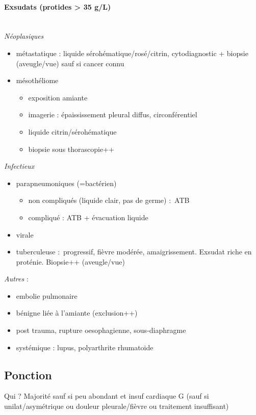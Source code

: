 \paragraph{Exsudats (protides > 35 g/L)}\mbox{}\\
\textit{Néoplasiques} 
\begin{itemize}
\item métastatique : liquide sérohématique/rosé/citrin, cytodiagnostic +
  biopsie (aveugle/vue) sauf si cancer connu
\item mésothéliome 
  \begin{itemize}
  \item exposition amiante
  \item imagerie : épaississement pleural diffus, circonférentiel
  \item liquide citrin/sérohématique
  \item biopsie sous thorascopie++
  \end{itemize}
\end{itemize}

\textit{Infectieux} 
\begin{itemize}
\item parapneumoniques (=bactérien) 
  \begin{itemize}
  \item non compliqués (liquide clair, pas de germe) : ATB
  \item compliqué : ATB + évacuation liquide
  \end{itemize}
\item virale
\item tuberculeuse : progressif, fièvre modérée, amaigrissement. Exsudat riche
  en proténie. Biopsie++ (aveugle/vue)
\end{itemize}

\textit{Autres}  :
\begin{itemize}
\item embolie pulmonaire
\item bénigne liée à l'amiante (exclusion++)
\item post trauma, rupture oesophagienne, sous-diaphragme
\item systémique : lupus, polyarthrite rhumatoide
\end{itemize}

\subsection{Ponction}
Qui ? Majorité sauf si peu abondant et insuf cardiaque G (sauf si
unilat/asymétrique ou douleur pleurale/fièvre ou traitement insuffisant)

